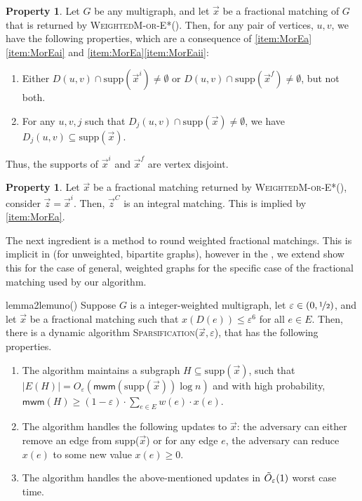 \documentclass[a4paper,11pt]{article}
\newcommand{\card}[1]{|#1|}
\newcommand{\eps}{\varepsilon}
\theoremstyle{definition}
\theoremstyle{definition}
\theoremstyle{definition}
\newtheorem{property}[definition2]{Property}
\theoremstyle{definition}
\theoremstyle{definition}
\theoremstyle{definition}
\theoremstyle{definition}
\theoremstyle{definition}
\theoremstyle{definition}
\theoremstyle{definition}
\theoremstyle{definition}
\theoremstyle{definition}
\theoremstyle{definition}
\theoremstyle{definition}
\theoremstyle{definition}
\begin{document}
 \begin{property}\label{prop:vertexdisjoint}
 Let $G$ be any multigraph, and let $\vec{x}$ be a fractional matching of $G$ that is returned by \textsc{WeightedM-or-E*}(). Then, for any pair of vertices, $u,v$, we have the following properties, which are a consequence of \ref{item:MorEa}\ref{item:MorEai} and \ref{item:MorEa}\ref{item:MorEaii}:
 \begin{enumerate}
 \item Either $D(u,v)\cap \text{supp}(\vec{x}^i)\neq \emptyset$ or $D(u,v)\cap \text{supp}(\vec{x}^f)\neq \emptyset$, but not both. 
 \item For any $u,v,j$ such that $D_j(u,v)\cap \text{supp}(\vec{x})\neq \emptyset$, we have $D_j(u,v)\subseteq \text{supp}(\vec{x})$.
 \end{enumerate}
 Thus, the supports of $\vec{x}^i$ and $\vec{x}^f$ are vertex disjoint.
  \end{property}
  \begin{property}\label{prop:integpart}
  Let $\vec{x}$ be a fractional matching returned by \textsc{WeightedM-or-E*}(), consider $\vec{z}=\vec{x}^i$. Then, $\vec{z}^C$ is an integral matching. This is implied by \ref{item:MorEa}. 
  \end{property}
   The next ingredient is a method to round weighted fractional matchings. This is implicit in \cite{Wajc2020} (for unweighted, bipartite graphs), however in the , we extend show this for the case of general, weighted graphs for the specific case of the fractional matching used by our algorithm. 
   
   \begin{restatable}{lemma2}{lemuno}\label{lem:sparsification}(\cite{Wajc2020})
   Suppose $G$ is a integer-weighted multigraph, let $\eps\in (0,\nicefrac{1}{2})$, and let $\vec{x}$ be a fractional matching such that $x(D(e))\leqslant \eps^6$ for all $e\in E$. Then, there is a dynamic algorithm \textsc{Sparsification}($\vec{x},\eps$), that has the following properties.
   \begin{enumerate}
   \item \label{lem:sparseb} The algorithm maintains a subgraph $H\subseteq \text{supp}(\vec{x})$, such that $\card{E(H)}=O_{\eps}(\textsf{mwm}(\text{supp}(\vec{x}))\log n)$ and with high probability, $\textsf{mwm}(H)\geqslant (1-\eps)\cdot \sum_{e\in E}w(e)\cdot x(e)$.
   \item \label{lem:sparsea} The algorithm handles the following updates to $\vec{x}$: the adversary can either remove an edge from supp($\vec{x}$) or for any edge $e$, the adversary can reduce $x(e)$ to some new value $x(e)\geqslant 0$. 
   \item The algorithm handles the above-mentioned updates in $\Tilde{O}_{\eps}(1)$ worst case time. 
   \end{enumerate}
   \end{restatable}
\end{document}
